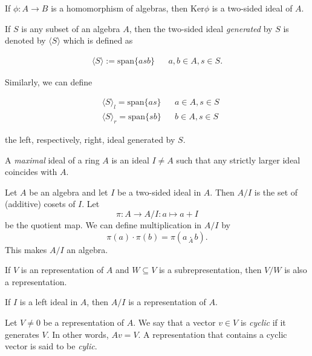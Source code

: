 \begin{thm}
If \(\phi :A\rightarrow B\) is a homomorphism of algebras, then \(\text{Ker} \phi \) is a two-sided ideal of \(A\).
\end{thm}

\begin{defn}
If \(S\) is any subset of an algebra \(A\), then the two-sided ideal \emph{generated} by \(S\) is denoted by \(\langle S\rangle \) which is defined as 

\begin{align*}\langle S\rangle :=\text{span}\{asb\} &&a,b\in A,s\in S.\end{align*}

Similarly, we can define

\begin{align*}&\langle S\rangle _{l} =\text{span}\{as\} &&a\in A,s\in S \\
&\langle S\rangle _{r} =\text{span}\{sb\} &&b\in A,s\in S\end{align*}

the left, respectively, right, ideal generated by \(S\).
\end{defn}

\begin{defn}
A \emph{maximal} ideal of a ring \(A\) is an ideal \(I\neq A\) such that any strictly larger ideal coincides with \(A\).
\end{defn}

\begin{defn}
Let \(A\) be an algebra and let \(I\) be a two-sided ideal in \(A\). Then \(A/I\) is the set of (additive) cosets of \(I\). Let 
$$\pi :A \rightarrow A/I : a \mapsto  a+I$$
be the quotient map. We can define multiplication in \(A/I\) by 
$$\pi (a)\cdot \pi (b)= \pi (a\underset{A}{\cdot }b).$$
This makes \(A/I\) an algebra.
\end{defn}

\begin{thm}
If \(V\) is an representation of \(A\) and \(W\subseteq V\) is a subrepresentation, then \(V/W\) is also a representation.
\end{thm}

\begin{thm}
If $I$ is a left ideal in \(A\), then $A/I$ is a representation of $A$.
\end{thm}

\begin{defn}
Let $V\neq 0$ be a representation of $A$. We say that a vector $v\in V$ is \emph{cyclic} if it generates $V$. In other words, $Av=V$. A representation that contains a cyclic vector is said to be \emph{cylic}.
\end{defn}

